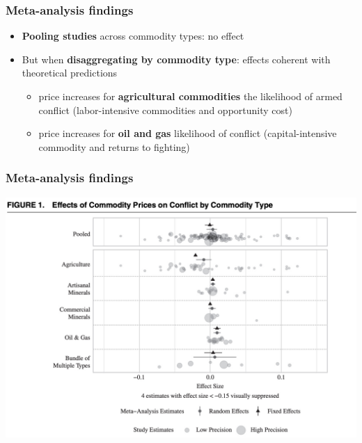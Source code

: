 \documentclass[aspectratio=43]{beamer}
\begin{document}
\begin{frame}
\frametitle{Meta-analysis findings}
\centering

\begin{itemize}
  \item \textbf{Pooling studies} across commodity types: no effect
  \item<2-> But when \textbf{disaggregating by commodity type}: effects coherent with theoretical predictions
  \begin{itemize}
    \item<3-> price increases for \textbf{agricultural commodities}  the likelihood of armed conflict (labor-intensive commodities and opportunity cost)
    \item<4-> price increases for \textbf{oil and gas}  likelihood of conflict (capital-intensive commodity and returns to fighting)
  \end{itemize}
\end{itemize}

\end{frame}

\begin{frame}
\frametitle{Meta-analysis findings}
\centering

\includegraphics[width = \textwidth]{../img/blair_apsr3}

\end{frame}
\end{document}

